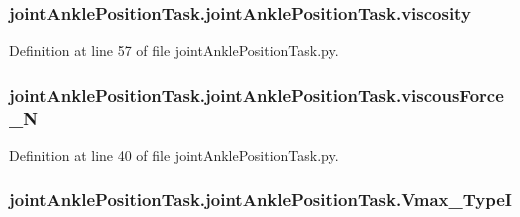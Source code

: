 \subsubsection[{\texorpdfstring{viscosity}{viscosity}}]{\setlength{\rightskip}{0pt plus 5cm}joint\+Ankle\+Position\+Task.\+joint\+Ankle\+Position\+Task.\+viscosity}\hypertarget{classjoint_ankle_position_task_1_1joint_ankle_position_task_a634997e38ef3dd8f734da93b25608917}{}\label{classjoint_ankle_position_task_1_1joint_ankle_position_task_a634997e38ef3dd8f734da93b25608917}


Definition at line 57 of file joint\+Ankle\+Position\+Task.\+py.

\subsubsection[{\texorpdfstring{viscous\+Force\+\_\+N}{viscousForce_N}}]{\setlength{\rightskip}{0pt plus 5cm}joint\+Ankle\+Position\+Task.\+joint\+Ankle\+Position\+Task.\+viscous\+Force\+\_\+N}\hypertarget{classjoint_ankle_position_task_1_1joint_ankle_position_task_a38c0b237285d83d71db630ff35e012c1}{}\label{classjoint_ankle_position_task_1_1joint_ankle_position_task_a38c0b237285d83d71db630ff35e012c1}


Definition at line 40 of file joint\+Ankle\+Position\+Task.\+py.

\subsubsection[{\texorpdfstring{Vmax\+\_\+\+TypeI}{Vmax_TypeI}}]{\setlength{\rightskip}{0pt plus 5cm}joint\+Ankle\+Position\+Task.\+joint\+Ankle\+Position\+Task.\+Vmax\+\_\+\+TypeI}\hypertarget{classjoint_ankle_position_task_1_1joint_ankle_position_task_a0a238e7c5bfe79cd05f0faf443bffd9b}{}\label{classjoint_ankle_position_task_1_1joint_ankle_position_task_a0a238e7c5bfe79cd05f0faf443bffd9b}


